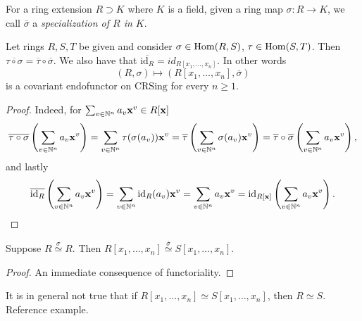 \begin{definition}
    For a ring extension $R\supset K$ where $K$ is a field, given a ring map $\sigma : R \rightarrow K$, we call $\overline{\sigma}$ a \textit{specialization of $R$ in $K$}.
\end{definition}
\begin{lemma}
    Let rings $R,S,T$ be given and consider $\sigma\in \mathrm{Hom}(R,S)$, $\tau\in \mathrm{Hom}(S,T)$. Then $\overline{\tau\circ \sigma} = \overline{\tau} \circ \overline{\sigma}$. We also have that $\overline{\text{id}_R}=\textit{id}_{R[x_1,\dots,x_n]}$. In other words 
    $$(R,\sigma)\mapsto (R[x_1,\dots,x_n],\overline{\sigma})$$
    is a covariant endofunctor on $\mathrm{CRSing}$ for every $n\geq 1$.  
\end{lemma}
\begin{proof}
    Indeed, for $\sum_{v\in \mathbb{N}^n} a_v\mathbf{x}^v\in R[\mathbf{x}]$
    \begin{align*}\overline{\tau \circ \sigma}\left(\sum_{v\in \mathbb{N}^n} a_v\mathbf{x}^v\right) = \sum_{v\in \mathbb{N}^n} \tau(\sigma(a_v))\mathbf{x}^v = \overline{\tau}\left(\sum_{v\in\mathbb{N}^n}\sigma(a_v)\mathbf{x}^v \right) = \overline{\tau}\circ\overline{\sigma}\left(\sum_{v\in\mathbb{N}^n}a_v\mathbf{x}^v \right),\end{align*}
    and lastly
    $$\overline{\text{id}_R}\left(\sum_{v\in \mathbb{N}^n} a_v\mathbf{x}^v \right) = \sum_{v\in \mathbb{N}^n} \text{id}_{R}(a_v)\mathbf{x}^v=\sum_{v\in \mathbb{N}^n} a_v\mathbf{x}^v= \text{id}_{R[\mathbf{x}]}\left( \sum_{v\in \mathbb{N}^n} a_v\mathbf{x}^v\right).$$
\end{proof}
\begin{corollary}\label{RingsIsomorphicImpliesPolynomialRingsIsomorphic}
    Suppose $R\overset{\sigma}{\simeq}R$. Then $R[x_1,\dots,x_n]\overset{\overline{\sigma}}{\simeq} S[x_1,\dots,x_n]$.
\end{corollary}
\begin{proof}
    An immediate consequence of functoriality. 
\end{proof}
\begin{example}
    It is in general not true that if $R[x_1,\dots,x_n]\simeq S[x_1,\dots,x_n]$, then $R\simeq S$. {\LARGE Reference example}.
\end{example}
